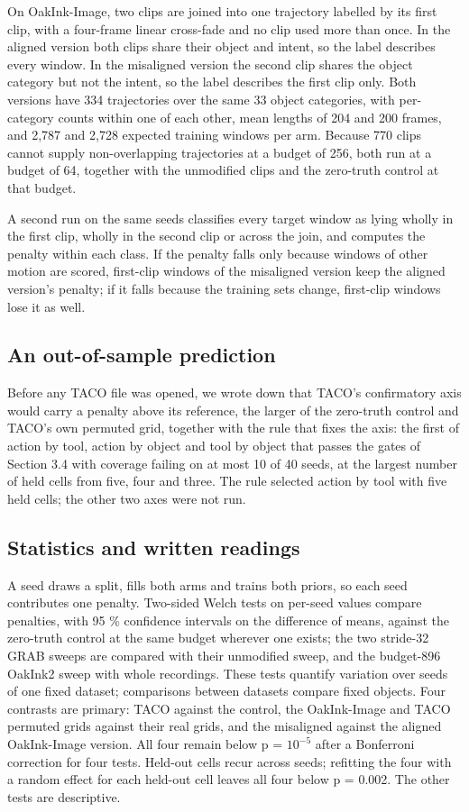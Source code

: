 \documentclass[10pt]{article}
\begin{document}
On OakInk-Image, two clips are joined into one trajectory labelled by its first clip, with a four-frame linear cross-fade and no clip used more than once. In the aligned version both clips share their object and intent, so the label describes every window. In the misaligned version the second clip shares the object category but not the intent, so the label describes the first clip only. Both versions have 334 trajectories over the same 33 object categories, with per-category counts within one of each other, mean lengths of 204 and 200 frames, and 2,787 and 2,728 expected training windows per arm. Because 770 clips cannot supply non-overlapping trajectories at a budget of 256, both run at a budget of 64, together with the unmodified clips and the zero-truth control at that budget.

A second run on the same seeds classifies every target window as lying wholly in the first clip, wholly in the second clip or across the join, and computes the penalty within each class. If the penalty falls only because windows of other motion are scored, first-clip windows of the misaligned version keep the aligned version's penalty; if it falls because the training sets change, first-clip windows lose it as well.

\subsection{An out-of-sample prediction}

Before any TACO file was opened, we wrote down that TACO's confirmatory axis would carry a penalty above its reference, the larger of the zero-truth control and TACO's own permuted grid, together with the rule that fixes the axis: the first of action by tool, action by object and tool by object that passes the gates of Section 3.4 with coverage failing on at most 10 of 40 seeds, at the largest number of held cells from five, four and three. The rule selected action by tool with five held cells; the other two axes were not run.

\subsection{Statistics and written readings}

A seed draws a split, fills both arms and trains both priors, so each seed contributes one penalty. Two-sided Welch tests \citep{welch1947generalization} on per-seed values compare penalties, with 95 \% confidence intervals on the difference of means, against the zero-truth control at the same budget wherever one exists; the two stride-32 GRAB sweeps are compared with their unmodified sweep, and the budget-896 OakInk2 sweep with whole recordings. These tests quantify variation over seeds of one fixed dataset; comparisons between datasets compare fixed objects. Four contrasts are primary: TACO against the control, the OakInk-Image and TACO permuted grids against their real grids, and the misaligned against the aligned OakInk-Image version. All four remain below p = $10^{-5}$ after a Bonferroni correction for four tests. Held-out cells recur across seeds; refitting the four with a random effect for each held-out cell leaves all four below p = 0.002. The other tests are descriptive.
\end{document}
